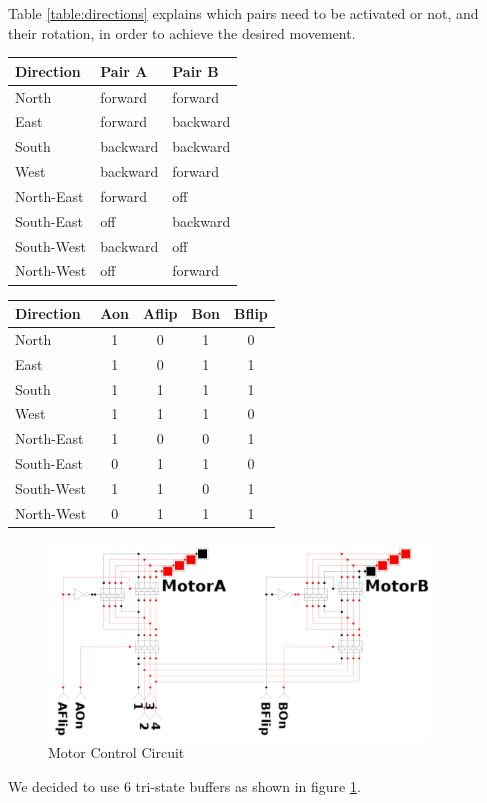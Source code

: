 Table \ref{table:directions} explains which pairs need to be activated or not, and their rotation, in order to achieve the desired movement.

\begin{center}
	\begin{tabular}{|l|l|l|}
		\hline
		Direction & Pair A & Pair B	\\
		\hline
		North & forward & forward \\
		East 	& forward & backward \\
		South & backward & backward \\
		West 	& backward & forward \\
		\hline
		North-East & forward & off \\
		South-East & off & backward \\
		South-West & backward & off\\
		North-West & off & forward \\
		\hline
	\end{tabular}
	\begin{tabular}{|l|c|c|c|c|}
		\hline
		Direction & Aon & Aflip & Bon & Bflip \\
		\hline
		North & 1 & 0 & 1 & 0 \\
		East 	& 1 & 0 & 1 & 1 \\
		South & 1 & 1 & 1 & 1 \\
		West 	& 1 & 1 & 1 & 0 \\
		\hline
		North-East & 1 & 0 & 0 & 1 \\
		South-East & 0 & 1 & 1 & 0 \\
		South-West & 1 & 1 & 0 & 1 \\
		North-West & 0 & 1 & 1 & 1 \\
		\hline
	\end{tabular}
	\label{table:directions}
\end{center}



\begin{figure}[htp]
	\centering
	\includegraphics[width=0.9\textwidth]{figures/move/direction_choice}
	\caption{Motor Control Circuit}
	\label{fig:mot_ctrl}
\end{figure}

We decided to use 6 tri-state buffers as shown in figure \ref{fig:mot_ctrl}.

